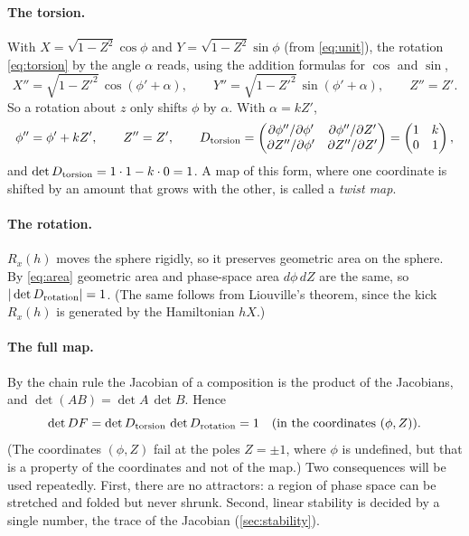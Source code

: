 \documentclass[11pt,a4paper]{article}
\begin{document}
\paragraph{The torsion.} With $X = \sqrt{1-Z^2}\cos\phi$ and $Y = \sqrt{1-Z^2}\sin\phi$ (from \eqref{eq:unit}), the
rotation \eqref{eq:torsion} by the angle $\alpha$ reads, using the addition formulas for $\cos$ and $\sin$,
\begin{equation*}
  X'' = \sqrt{1-Z'^2}\,\cos(\phi'+\alpha), \qquad Y'' = \sqrt{1-Z'^2}\,\sin(\phi'+\alpha), \qquad Z'' = Z' .
\end{equation*}
So a rotation about $z$ only shifts $\phi$ by $\alpha$. With $\alpha = kZ'$,
\begin{equation}\label{eq:twist}
  \phi'' = \phi' + kZ', \qquad Z'' = Z' ,
  \qquad
  D_{\rm torsion} = \begin{pmatrix} \partial\phi''/\partial\phi' & \partial\phi''/\partial Z'\\ \partial Z''/\partial\phi' & \partial Z''/\partial Z'\end{pmatrix}
  = \begin{pmatrix}1 & k\\ 0 & 1\end{pmatrix},
\end{equation}
and $\det D_{\rm torsion} = 1\cdot1 - k\cdot0 = 1$. A map of this form, where one coordinate is shifted by an amount
that grows with the other, is called a \emph{twist map}.

\paragraph{The rotation.} $R_x(h)$ moves the sphere rigidly, so it preserves geometric area on the sphere. By
\eqref{eq:area} geometric area and phase-space area $d\phi\,dZ$ are the same, so $|\det D_{\rm rotation}| = 1$. (The
same follows from Liouville's theorem, since the kick $R_x(h)$ is generated by the Hamiltonian $hX$.)

\paragraph{The full map.} By the chain rule the Jacobian of a composition is the product of the Jacobians, and
$\det(AB) = \det A\,\det B$. Hence
\begin{equation}
  \det DF = \det D_{\rm torsion}\,\det D_{\rm rotation} = 1 \quad\text{(in the coordinates $(\phi,Z)$)}.
\end{equation}
(The coordinates $(\phi,Z)$ fail at the poles $Z=\pm1$, where $\phi$ is undefined, but that is a property of the
coordinates and not of the map.) Two consequences will be used repeatedly. First, there are no attractors: a region of
phase space can be stretched and folded but never shrunk. Second, linear stability is decided by a single number,
the trace of the Jacobian (\cref{sec:stability}).
\end{document}
